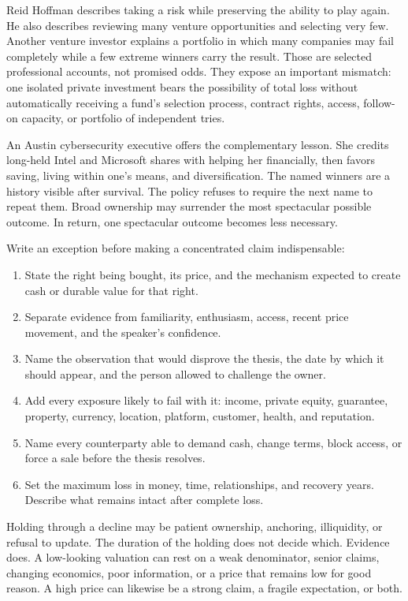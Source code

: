 Reid Hoffman describes taking a risk while preserving the ability to play
again. He also describes reviewing many venture opportunities and selecting
very few. Another venture investor explains a portfolio in which many
companies may fail completely while a few extreme winners carry the result.
Those are selected professional accounts, not promised odds. They expose an
important mismatch: one isolated private investment bears the possibility of
total loss without automatically receiving a fund's selection process,
contract rights, access, follow-on capacity, or portfolio of independent tries.

An Austin cybersecurity executive offers the complementary lesson. She credits
long-held Intel and Microsoft shares with helping her financially, then favors
saving, living within one's means, and diversification. The named winners are
a history visible after survival. The policy refuses to require the next name
to repeat them. Broad ownership may surrender the most spectacular possible
outcome. In return, one spectacular outcome becomes less necessary.

Write an exception before making a concentrated claim indispensable:

\begin{enumerate}[itemsep=0.12em]
\item State the right being bought, its price, and the mechanism expected to
  create cash or durable value for that right.
\item Separate evidence from familiarity, enthusiasm, access, recent price
  movement, and the speaker's confidence.
\item Name the observation that would disprove the thesis, the date by which it
  should appear, and the person allowed to challenge the owner.
\item Add every exposure likely to fail with it: income, private equity,
  guarantee, property, currency, location, platform, customer, health, and
  reputation.
\item Name every counterparty able to demand cash, change terms, block access,
  or force a sale before the thesis resolves.
\item Set the maximum loss in money, time, relationships, and recovery years.
  Describe what remains intact after complete loss.
\end{enumerate}

Holding through a decline may be patient ownership, anchoring, illiquidity, or
refusal to update. The duration of the holding does not decide which. Evidence
does. A low-looking valuation can rest on a weak denominator, senior claims,
changing economics, poor information, or a price that remains low for good
reason. A high price can likewise be a strong claim, a fragile expectation, or
both.

